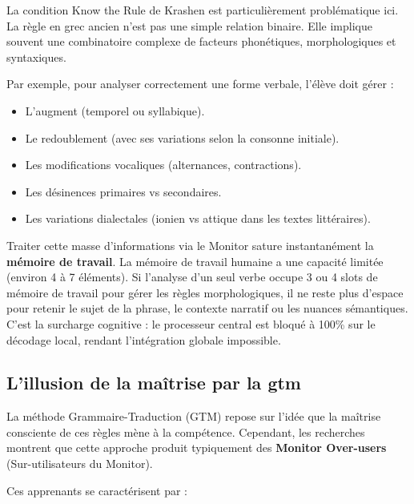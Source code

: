 La condition \og Know the Rule\fg{} de Krashen est particulièrement problématique ici. La \og
règle\fg{} en grec ancien n'est pas une simple relation binaire. Elle implique souvent une
combinatoire complexe de facteurs phonétiques, morphologiques et syntaxiques.

Par exemple, pour analyser correctement une forme verbale, l'élève doit gérer :

\begin{itemize}\item L'augment (temporel ou syllabique).\item Le redoublement (avec ses variations selon la consonne initiale).\item Les modifications vocaliques (alternances, contractions).\item Les désinences primaires vs secondaires.\item Les variations dialectales (ionien vs attique dans les textes littéraires).\end{itemize}Traiter cette masse d'informations via le Monitor sature instantanément la \textbf{mémoire de
travail}. La mémoire de travail humaine a une capacité limitée (environ 4 à 7 éléments). Si
l'analyse d'un seul verbe occupe 3 ou 4 \og slots\fg{} de mémoire de travail pour gérer les règles
morphologiques, il ne reste plus d'espace pour retenir le sujet de la phrase, le contexte narratif
ou les nuances sémantiques.\cite{II-2-3-ref19} C'est la surcharge cognitive : le processeur central
est bloqué à 100\% sur le décodage local, rendant l'intégration globale impossible.



\subsection{L'illusion de la maîtrise par la gtm}

La méthode Grammaire-Traduction (GTM) repose sur l'idée que la maîtrise consciente de ces règles
mène à la compétence. Cependant, les recherches montrent que cette approche produit typiquement des
\textbf{\og Monitor Over-users\fg{}} (Sur-utilisateurs du Monitor).\cite{II-2-3-ref26}

Ces apprenants se caractérisent par :

